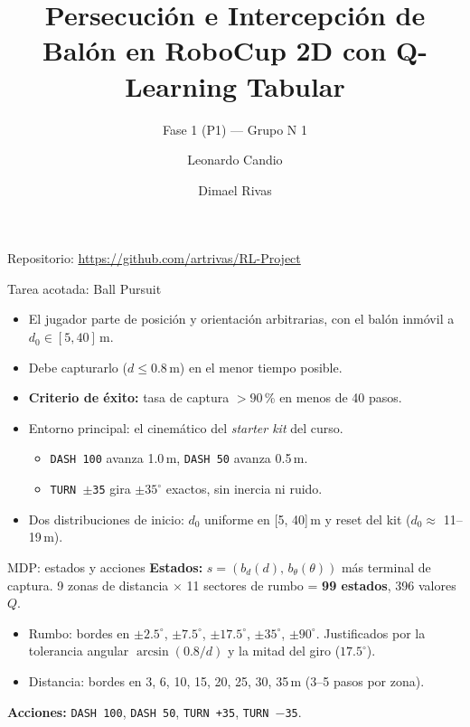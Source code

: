 \documentclass[10pt]{beamer}
\title[RL RoboCup 2D]{Persecución e Intercepción de Balón en RoboCup 2D con Q-Learning Tabular}
\subtitle{Fase 1 (P1) --- Grupo N\textdegree{} 1}
\author[Grupo 1]{Leonardo Candio \and Dimael Rivas}
\institute[UTEC]{DS5345 $\cdot$ Aprendizaje por Refuerzo (2026-II) \\ Docente: Percy W. Lovón Ramos}
\date{}
\begin{document}
\begin{frame}
    \titlepage
    \begin{center}
        \small Repositorio: \url{https://github.com/artrivas/RL-Project}
    \end{center}
\end{frame}

\begin{frame}{Tarea acotada: Ball Pursuit}
    \begin{itemize}
        \item El jugador parte de posición y orientación arbitrarias, con el balón inmóvil a $d_0 \in [5, 40]$\,m.
        \item Debe capturarlo ($d \le 0.8$\,m) en el menor tiempo posible.
        \item \textbf{Criterio de éxito:} tasa de captura $> 90$\,\% en menos de 40 pasos.
        \item Entorno principal: el cinemático del \textit{starter kit} del curso.
        \begin{itemize}
            \item \texttt{DASH 100} avanza 1.0\,m, \texttt{DASH 50} avanza 0.5\,m.
            \item \texttt{TURN $\pm$35} gira $\pm 35^\circ$ exactos, sin inercia ni ruido.
        \end{itemize}
        \item Dos distribuciones de inicio: $d_0$ uniforme en [5, 40]\,m y reset del kit ($d_0 \approx$ 11--19\,m).
    \end{itemize}
\end{frame}

\begin{frame}{MDP: estados y acciones}
    \textbf{Estados:} $s = (b_d(d),\, b_\theta(\theta))$ más terminal de captura.
    9 zonas de distancia $\times$ 11 sectores de rumbo = \textbf{99 estados}, 396 valores $Q$.
    \begin{itemize}
        \item Rumbo: bordes en $\pm 2.5^\circ$, $\pm 7.5^\circ$, $\pm 17.5^\circ$, $\pm 35^\circ$, $\pm 90^\circ$.
        Justificados por la tolerancia angular $\arcsin(0.8/d)$ y la mitad del giro ($17.5^\circ$).
        \item Distancia: bordes en 3, 6, 10, 15, 20, 25, 30, 35\,m (3--5 pasos por zona).
    \end{itemize}
    \textbf{Acciones:} \texttt{DASH 100}, \texttt{DASH 50}, \texttt{TURN +35}, \texttt{TURN $-$35}.
\end{frame}
\end{document}
